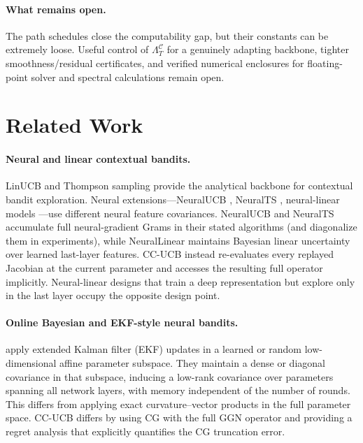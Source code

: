 \documentclass[twoside]{article}
\newcommand{\Calg}{\mathcal{C}}                 %
\newcommand{\Lamalg}{\Lambda^{\Calg}}           %
\begin{document}
\paragraph{What remains open.}
The path schedules close the computability gap, but their constants can be
extremely loose.  Useful control of $\Lamalg_T$ for a genuinely adapting
backbone, tighter smoothness/residual certificates, and verified numerical
enclosures for floating-point solver and spectral calculations remain open.



\section{Related Work}\label{sec:related}

\paragraph{Neural and linear contextual bandits.}
LinUCB \citep{abbasi2011improved} and Thompson sampling
\citep{thompson1933likelihood,agrawal2013thompson} provide the analytical
backbone for contextual bandit exploration.  Neural extensions---NeuralUCB
\citep{zhou2020neural}, NeuralTS \citep{zhang2021neural}, neural-linear
models \citep{riquelme2018deep}---use different neural feature covariances.
NeuralUCB and NeuralTS accumulate full neural-gradient Grams in their stated
algorithms (and diagonalize them in experiments), while NeuralLinear maintains
Bayesian linear uncertainty over learned last-layer features.  CC-UCB instead
re-evaluates every replayed Jacobian at the current parameter and accesses the
resulting full operator implicitly.
Neural-linear designs that train a deep representation but explore only
in the last layer \citep{xu2022shallow} occupy the opposite design point.

\paragraph{Online Bayesian and EKF-style neural bandits.}
\citet{duranmartin2022efficient} apply extended Kalman filter (EKF)
updates in a learned or random low-dimensional affine parameter subspace.
They maintain a dense or diagonal covariance in that subspace, inducing a
low-rank covariance over parameters spanning all network layers, with memory
independent of the number of rounds.  This differs from applying exact
curvature--vector products in the full parameter space.
CC-UCB differs by using CG with the full GGN operator and providing a
regret analysis that explicitly quantifies the CG truncation error.
\end{document}
